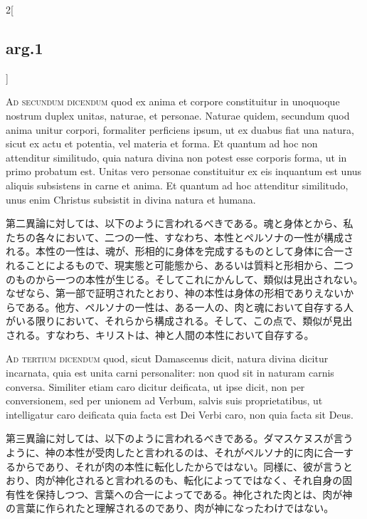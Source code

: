 \documentclass[paper=a4paper,fontsize=10pt,jafontsize=9pt,titlepage]{jlreq}
\begin{document}
\begin{paracol}{2}[\subsection{arg.1}]
\switchcolumn*[\subsection{ad.2}]

{\scshape Ad secundum dicendum} quod ex anima et corpore constituitur
in unoquoque nostrum duplex unitas, naturae, et personae. Naturae
quidem, secundum quod anima unitur corpori, formaliter perficiens
ipsum, ut ex duabus fiat una natura, sicut ex actu et potentia, vel
materia et forma. Et quantum ad hoc non attenditur similitudo, quia
natura divina non potest esse corporis forma, ut in primo probatum
est. Unitas vero personae constituitur ex eis inquantum est unus
aliquis subsistens in carne et anima. Et quantum ad hoc attenditur
similitudo, unus enim Christus subsistit in divina natura et humana.

\switchcolumn

第二異論に対しては、以下のように言われるべきである。魂と身体とから、私
たちの各々において、二つの一性、すなわち、本性とペルソナの一性が構成さ
れる。本性の一性は、魂が、形相的に身体を完成するものとして身体に合一さ
れることによるもので、現実態と可能態から、あるいは質料と形相から、二つ
のものから一つの本性が生じる。そしてこれにかんして、類似は見出されない。
なぜなら、第一部で証明されたとおり、神の本性は身体の形相でありえないか
らである。他方、ペルソナの一性は、ある一人の、肉と魂において自存する人
がいる限りにおいて、それらから構成される。そして、この点で、類似が見出
される。すなわち、キリストは、神と人間の本性において自存する。

\switchcolumn*[\subsection{ad.3}]

{\scshape Ad tertium dicendum} quod, sicut Damascenus dicit, natura
divina dicitur incarnata, quia est unita carni personaliter: non quod
sit in naturam carnis conversa. Similiter etiam caro dicitur
deificata, ut ipse dicit, non per conversionem, sed per unionem ad
Verbum, salvis suis proprietatibus, ut intelligatur caro deificata
quia facta est Dei Verbi caro, non quia facta sit Deus.

\switchcolumn

第三異論に対しては、以下のように言われるべきである。ダマスケヌスが言う
ように、神の本性が受肉したと言われるのは、それがペルソナ的に肉に合一す
るからであり、それが肉の本性に転化したからではない。同様に、彼が言うと
おり、肉が神化されると言われるのも、転化によってではなく、それ自身の固
有性を保持しつつ、言葉への合一によってである。神化された肉とは、肉が神
の言葉に作られたと理解されるのであり、肉が神になったわけではない。

\end{paracol}
\newpage
\end{document}
